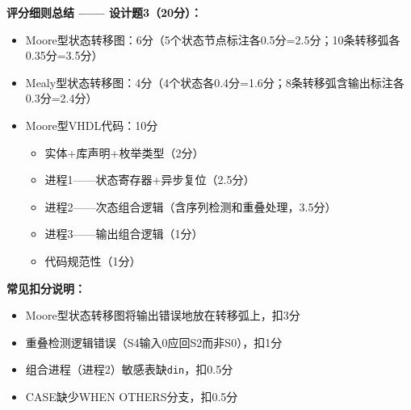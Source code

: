 \vspace{0.5cm}
\begin{framed}
\textbf{评分细则总结 —— 设计题3（20分）：}
\begin{itemize}
\item Moore型状态转移图：6分（5个状态节点标注各0.5分=2.5分；10条转移弧各0.35分=3.5分）
\item Mealy型状态转移图：4分（4个状态各0.4分=1.6分；8条转移弧含输出标注各0.3分=2.4分）
\item Moore型VHDL代码：10分
  \begin{itemize}
  \item 实体+库声明+枚举类型（2分）
  \item 进程1——状态寄存器+异步复位（2.5分）
  \item 进程2——次态组合逻辑（含序列检测和重叠处理，3.5分）
  \item 进程3——输出组合逻辑（1分）
  \item 代码规范性（1分）
  \end{itemize}
\end{itemize}

\textbf{常见扣分说明：}
\begin{itemize}
\item Moore型状态转移图将输出错误地放在转移弧上，扣3分
\item 重叠检测逻辑错误（S4输入0应回S2而非S0），扣1分
\item 组合进程（进程2）敏感表缺\texttt{din}，扣0.5分
\item CASE缺少WHEN OTHERS分支，扣0.5分
\end{itemize}
\end{framed}

\endinput
